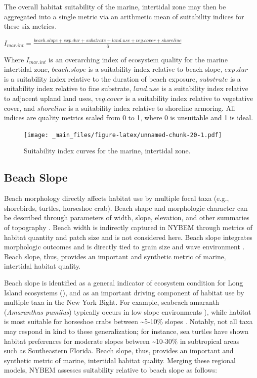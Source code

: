 \documentclass[
]{book}
\begin{document}
The overall habitat suitability of the marine, intertidal zone may then be aggregated into a single metric via an arithmetic mean of suitability indices for these six metrics.

\(I_{mar.int} = \frac{beach.slope + exp.dur + substrate + land.use + veg.cover + shoreline}{6}\)

Where \(I_{mar.int}\) is an overarching index of ecosystem quality for the marine intertidal zone, \(beach.slope\) is a suitability index relative to beach slope, \(exp.dur\) is a suitability index relative to the duration of beach exposure, \(substrate\) is a suitability index relative to fine substrate, \(land.use\) is a suitability index relative to adjacent upland land uses, \(veg.cover\) is a suitability index relative to vegetative cover, and \(shoreline\) is a suitability index relative to shoreline armoring. All indices are quality metrics scaled from 0 to 1, where 0 is unsuitable and 1 is ideal.

\begin{figure}
\centering
\texttt{[image: \_main\_files/figure-latex/unnamed-chunk-20-1.pdf]}
\caption{\label{fig:unnamed-chunk-20}Suitability index curves for the marine, intertidal zone.}
\end{figure}

\hypertarget{beach-slope}{%
\subsection{Beach Slope}\label{beach-slope}}

Beach morphology directly affects habitat use by multiple focal taxa (e.g., shorebirds, turtles, horseshoe crab). Beach shape and morphologic character can be described through parameters of width, slope, elevation, and other summaries of topography \citep{bridges_use_2015}. Beach width is indirectly captured in NYBEM through metrics of habitat quantity and patch size and is not considered here. Beach slope integrates morphologic outcomes and is directly tied to grain size and wave environment \citep{lodder_chapter_2021}. Beach slope, thus, provides an important and synthetic metric of marine, intertidal habitat quality.

Beach slope is identified as a general indicator of ecosystem condition for Long Island ecosystems (\citet{usace_evaluation_2009}), and as an important driving component of habitat use by multiple taxa in the New York Bight. For example, seabeach amaranth (\emph{Amaranthus pumilus}) typically occurs in low slope environments \citep{sellars_habitat_2007}), while habitat is most suitable for horseshoe crabs between \textasciitilde5-10\% slopes \citep{brady_habitat_1996}. Notably, not all taxa may respond in kind to these generalization; for instance, sea turtles have shown habitat preferences for moderate slopes between \textasciitilde10-30\% in subtropical areas such as Southeastern Florida. Beach slope, thus, provides an important and synthetic metric of marine, intertidal habitat quality. Merging these regional models, NYBEM assesses suitability relative to beach slope as follows:
\end{document}

